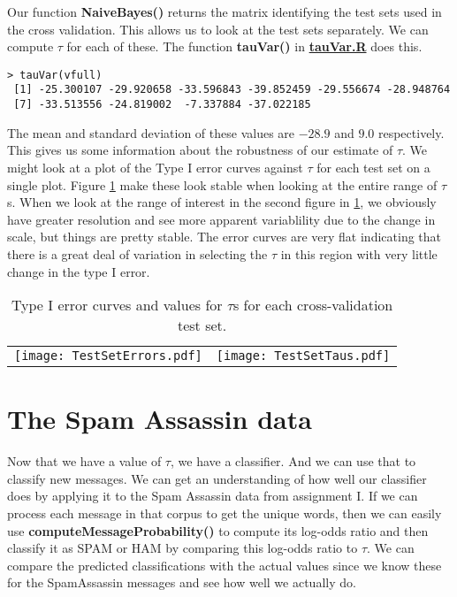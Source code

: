 \documentclass{article}
\def\SFunction#1{\textbf{#1()}}
\def\file#1{\HREF{http://winnie.ucdavis.edu/stat141/Winter04/Homework/NaieveBayes/Solutions/#1}{\textbf{#1}}}
\def\HREF#1#2{\href{#1}{#2}}
\begin{document}
Our function \SFunction{NaiveBayes} returns the matrix identifying the
test sets used in the cross validation.  This allows us to look at the
test sets separately.  We can compute $\tau$ for each of these.  The
function \SFunction{tauVar} in \file{tauVar.R} does this.

\begin{verbatim}
> tauVar(vfull)
 [1] -25.300107 -29.920658 -33.596843 -39.852459 -29.556674 -28.948764
 [7] -33.513556 -24.819002  -7.337884 -37.022185
\end{verbatim}
The mean and standard deviation of these values are $-28.9$ and $9.0$
respectively.  This gives us some information about the robustness of
our estimate of $\tau$.  We might look at a plot of the Type I error
curves against $\tau$ for each test set on a single plot.  Figure
\ref{tab:cvtaus} make these look stable when looking at the
entire range of $\tau$s.  When we look at the range of interest in
the second figure in \ref{tab:cvtaus}, we obviously have greater resolution and
see more apparent variablility due to the change in scale,
but things are pretty stable.  The error curves
are very flat indicating that there is a great deal of variation in
selecting the $\tau$ in this region with very little change in the
type I error.
\begin{table}[htbp]
  \begin{center}
    \leavevmode
    \begin{tabular}{cc}
    \texttt{[image: TestSetErrors.pdf]}
&
    \texttt{[image: TestSetTaus.pdf]}
    \end{tabular}
    \caption{Type I error curves and values for $\tau$s for each cross-validation test set.}
    \label{tab:cvtaus}
  \end{center}
\end{table}


\section{The Spam Assassin data}


Now that we have a value of $\tau$, we have a classifier.  And we can
use that to classify new messages.  We can get an understanding of how
well our classifier does by applying it to the Spam Assassin data from
assignment I.  If we can process each message in that corpus to get
the unique words, then we can easily use
\SFunction{computeMessageProbability} to compute its log-odds ratio
and then classify it as SPAM or HAM by comparing this log-odds ratio
to $\tau$.  We can compare the predicted classifications with the
actual values since we know these for the SpamAssassin messages and
see how well we actually do.
\end{document}
